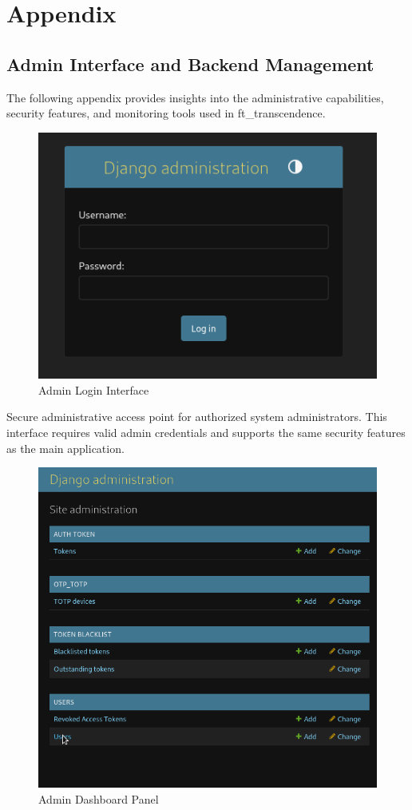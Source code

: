 
\chapter{Appendix}
\begin{appendices}
    \section{Admin Interface and Backend Management}
    The following appendix provides insights into the administrative capabilities, security features, and monitoring tools used in ft\_transcendence.

    \begin{figure}[H]
        \centering
        \includegraphics[width=0.7\linewidth]{Figures/appendix/DjangoAdminLogin.png}
        \caption*{Admin Login Interface}
        \label{fig:django-admin-login}
    \end{figure}
    
    \noindent Secure administrative access point for authorized system administrators. This interface requires valid admin credentials and supports the same security features as the main application.

    \begin{figure}[H]
        \centering
        \includegraphics[width=0.75\linewidth]{Figures/appendix/DjangoAdminHome.png}
        \caption*{Admin Dashboard Panel}
        \label{fig:django-admin-home}
    \end{figure}
    

\end{appendices}
